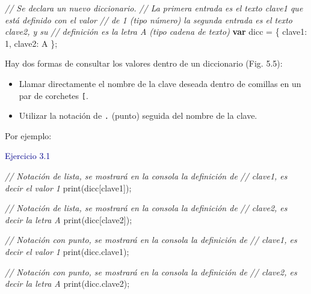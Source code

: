 \documentclass[
  12pt,
  letterpaper,
  twoside]{book}
\newenvironment{Shaded}{\begin{snugshade}}{\end{snugshade}}
\newcommand{\AttributeTok}[1]{\textcolor[rgb]{0.48,0.12,0.64}{#1}}
\newcommand{\CommentTok}[1]{\textcolor[rgb]{0.24,0.58,0.00}{\textit{#1}}}
\newcommand{\ControlFlowTok}[1]{\textcolor[rgb]{0.00,0.00,0.00}{\textbf{#1}}}
\newcommand{\DataTypeTok}[1]{\textcolor[rgb]{0.00,0.00,0.00}{#1}}
\newcommand{\DecValTok}[1]{\textcolor[rgb]{0.28,0.53,0.93}{#1}}
\newcommand{\FunctionTok}[1]{\textcolor[rgb]{0.48,0.12,0.64}{#1}}
\newcommand{\NormalTok}[1]{#1}
\newcommand{\OperatorTok}[1]{\textcolor[rgb]{0.00,0.00,0.00}{#1}}
\newcommand{\StringTok}[1]{\textcolor[rgb]{0.87,0.29,0.22}{#1}}
\providecommand{\tightlist}{%
  \setlength{\itemsep}{0pt}\setlength{\parskip}{0pt}}
\begin{document}
\begin{Shaded}
\begin{Highlighting}[]
\CommentTok{// Se declara un nuevo diccionario.}
\CommentTok{// La primera entrada es el texto \textquotesingle{}clave1\textquotesingle{} que está definido con el valor}
\CommentTok{// de 1 (tipo número) la segunda entrada es el texto \textquotesingle{}clave2\textquotesingle{}, y su }
\CommentTok{// definición es la letra \textquotesingle{}A\textquotesingle{} (tipo cadena de texto)}
\ControlFlowTok{var}\NormalTok{ dicc }\OperatorTok{=}\NormalTok{ \{   }
  \DataTypeTok{clave1}\OperatorTok{:} \DecValTok{1}\OperatorTok{,}      
  \DataTypeTok{clave2}\OperatorTok{:} \StringTok{\textquotesingle{}A\textquotesingle{}}  
\NormalTok{\}}\OperatorTok{;}            
      
\end{Highlighting}
\end{Shaded}

Hay dos formas de consultar los valores dentro de un diccionario (Fig. 5.5):

\begin{itemize}
\tightlist
\item
  Llamar directamente el nombre de la clave deseada dentro de comillas en un par de corchetes \texttt{{[}\textquotesingle{}\textquotesingle{}{]}}.
\item
  Utilizar la notación de \texttt{.} (punto) seguida del nombre de la clave.
\end{itemize}

Por ejemplo:

\textcolor{darkblue}{Ejercicio 3.1}

\begin{Shaded}
\begin{Highlighting}[]
\CommentTok{// Notación de lista, se mostrará en la consola la definición de }
\CommentTok{// \textquotesingle{}clave1\textquotesingle{}, es decir el valor 1 }
\FunctionTok{print}\NormalTok{(dicc[}\StringTok{\textquotesingle{}clave1\textquotesingle{}}\NormalTok{])}\OperatorTok{;} 

\CommentTok{// Notación de lista, se mostrará en la consola la definición de }
\CommentTok{// \textquotesingle{}clave2\textquotesingle{}, es decir la letra \textquotesingle{}A\textquotesingle{}}
\FunctionTok{print}\NormalTok{(dicc[}\StringTok{\textquotesingle{}clave2\textquotesingle{}}\NormalTok{])}\OperatorTok{;}  

\CommentTok{// Notación con punto, se mostrará en la consola la definición de }
\CommentTok{// \textquotesingle{}clave1\textquotesingle{}, es decir el valor 1 }
\FunctionTok{print}\NormalTok{(dicc}\OperatorTok{.}\AttributeTok{clave1}\NormalTok{)}\OperatorTok{;}  

\CommentTok{// Notación con punto, se mostrará en la consola la definición de }
\CommentTok{// \textquotesingle{}clave2\textquotesingle{}, es decir la letra \textquotesingle{}A\textquotesingle{}}
\FunctionTok{print}\NormalTok{(dicc}\OperatorTok{.}\AttributeTok{clave2}\NormalTok{)}\OperatorTok{;}  
\end{Highlighting}
\end{Shaded}
\end{document}
